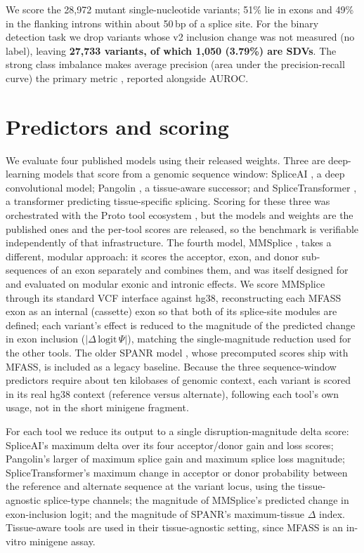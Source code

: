 \documentclass[11pt]{article}
\let\oldsection\section
\renewcommand{\section}{\Needspace*{7\baselineskip}\oldsection}
\begin{document}
We score the 28{,}972 mutant single-nucleotide variants; 51\% lie in exons and 49\%
in the flanking introns within about 50\,bp of a splice site. For the binary
detection task we drop variants whose v2 inclusion change was not measured (no
label), leaving \textbf{27{,}733 variants, of which 1{,}050 (3.79\%) are SDVs}.
The strong class imbalance makes average precision (area under the
precision-recall curve) the primary metric \cite{prroc}, reported alongside AUROC.

\section{Predictors and scoring}
We evaluate four published models using their released weights. Three are
deep-learning models that score from a genomic sequence window: SpliceAI
\cite{spliceai}, a deep convolutional model; Pangolin \cite{pangolin}, a
tissue-aware successor; and SpliceTransformer \cite{splicetransformer}, a
transformer predicting tissue-specific splicing. Scoring for these three was
orchestrated with the Proto tool ecosystem \cite{proto}, but the models and weights
are the published ones and the per-tool scores are released, so the benchmark is
verifiable independently of that infrastructure. The fourth model, MMSplice
\cite{mmsplice}, takes a different, modular approach: it scores the acceptor, exon,
and donor sub-sequences of an exon separately and combines them, and was itself
designed for and evaluated on modular exonic and intronic effects. We score MMSplice
through its standard VCF interface against hg38, reconstructing each MFASS exon as an
internal (cassette) exon so that both of its splice-site modules are defined; each
variant's effect is reduced to the magnitude of the predicted change in exon
inclusion ($|\Delta\,\mathrm{logit}\,\Psi|$), matching the single-magnitude reduction
used for the other tools. The older SPANR model \cite{spanr}, whose precomputed
scores ship with MFASS, is included as a legacy baseline. Because the three
sequence-window predictors require about ten kilobases of genomic context,
each variant is scored in its real hg38 context (reference versus alternate),
following each tool's own usage, not in the short minigene fragment.

For each tool we reduce its output to a single disruption-magnitude delta score:
SpliceAI's maximum delta over its four acceptor/donor gain and loss scores;
Pangolin's larger of maximum splice gain and maximum splice loss magnitude;
SpliceTransformer's maximum change in acceptor or donor probability between the
reference and alternate sequence at the variant locus, using the tissue-agnostic
splice-type channels; the magnitude of MMSplice's predicted change in exon-inclusion
logit; and the magnitude of SPANR's maximum-tissue $\Delta$ index.
Tissue-aware tools are used in their tissue-agnostic setting, since MFASS is an
in-vitro minigene assay.
\end{document}
